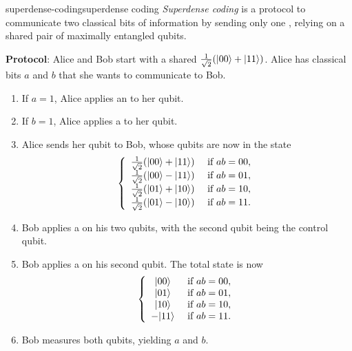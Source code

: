 \begin{topic}{superdense-coding}{superdense coding}
    \emph{Superdense coding} is a protocol to communicate two classical bits of information by sending only one , relying on a shared pair of maximally entangled qubits.

    \textbf{Protocol}: Alice and Bob start with a shared  $\tfrac{1}{\sqrt{2}} (|00\rangle + |11\rangle)$. Alice has classical bits $a$ and $b$ that she wants to communicate to Bob.
    \begin{enumerate}[label=(\arabic*)]
        \item If $a = 1$, Alice applies an  to her qubit.
        \item If $b = 1$, Alice applies a  to her qubit.
        \item Alice sends her qubit to Bob, whose qubits are now in the state
        \[ \left\{ \begin{array}{cl}
            \frac{1}{\sqrt{2}} (|00\rangle + |11\rangle) & \textup{ if } ab = 00 , \\
            \frac{1}{\sqrt{2}} (|00\rangle - |11\rangle) & \textup{ if } ab = 01 , \\
            \frac{1}{\sqrt{2}} (|01\rangle + |10\rangle) & \textup{ if } ab = 10 , \\
            \frac{1}{\sqrt{2}} (|01\rangle - |10\rangle) & \textup{ if } ab = 11 .
        \end{array} \right. \]
        \item Bob applies a  on his two qubits, with the second qubit being the control qubit.
        \item Bob applies a  on his second qubit. The total state is now
        \[ \left\{ \begin{array}{cl}
            |00\rangle & \textup{ if } ab = 00 , \\
            |01\rangle & \textup{ if } ab = 01 , \\
            |10\rangle & \textup{ if } ab = 10 , \\
            - |11\rangle & \textup{ if } ab = 11 .
        \end{array} \right. \]
        \item Bob measures both qubits, yielding $a$ and $b$.
    \end{enumerate}
\end{topic}

